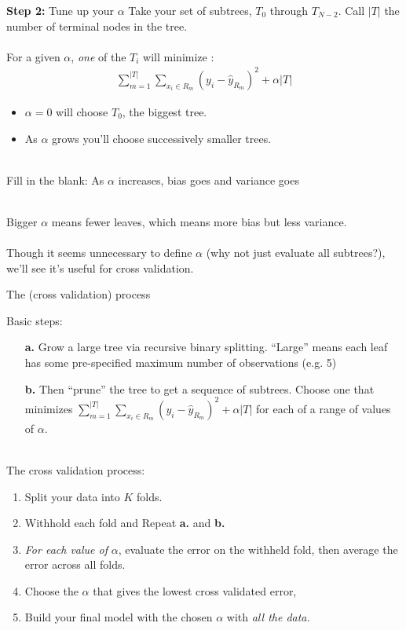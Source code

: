 \documentclass[mathserif, aspectratio=169]{beamer}
\begin{document}
\begin{frame}{\textbf{Step 2: } Tune up your $\alpha$}
Take your set of subtrees, $T_0$ through $T_{N-2}$.  Call $|T|$ the number of terminal nodes in the tree.\\~\\

For a given $\alpha$, \textit{one} of the $T_i$ will minimize :
\begin{align*}
\sum_{m=1}^{|T|} \sum_{x_i\in R_m} (y_i-\hat{y}_{R_m})^2+\alpha|T|
\end{align*}

\begin{itemize}
\item $\alpha=0$ will choose $T_0$, the biggest tree.
\item As $\alpha$ grows you'll choose successively smaller trees.  \\~\\
\end{itemize}

Fill in the blank:  As $\alpha$ increases, bias goes \underline{} and variance goes \underline{} \\~\\ \pause

Bigger $\alpha$ means fewer leaves, which means more bias but less variance.   \\~\\

Though it seems unnecessary to define $\alpha$ (why not just evaluate all subtrees?), we'll see it's useful for cross validation.  
\end{frame}

\begin{frame}{The (cross validation) process}

Basic steps:
\begin{enumerate}
\item[\textbf{a.}] Grow a large tree via recursive binary splitting.  ``Large'' means each leaf has some pre-specified maximum number of observations (e.g. 5)
\item[\textbf{b.}] Then ``prune'' the tree to get a sequence of subtrees.  Choose one that minimizes $\sum_{m=1}^{|T|} \sum_{x_i\in R_m} (y_i-\hat{y}_{R_m})^2+\alpha|T|$ for each of a range of values of $\alpha$.\\~\\
\end{enumerate}
\pause
The cross validation process:
\begin{enumerate}
\item Split your data into $K$ folds.  
\item Withhold each fold and Repeat \textbf{a.} and \textbf{b.} 
\item \textit{For each value of }$\alpha$, evaluate the error on the withheld fold, then average the error across all folds.
\item Choose the $\alpha$ that gives the lowest cross validated error, 
\item Build your final model with the chosen $\alpha$ with \textit{all the data.}
\end{enumerate}
\end{frame}
\end{document}
